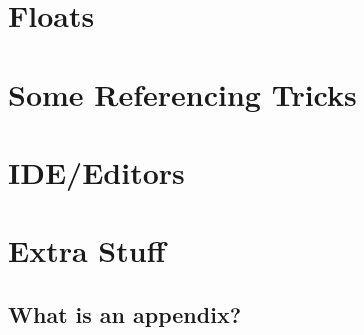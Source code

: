 \documentclass[a4paper,twoside,12pt]{report}
\begin{document}
\chapter{Floats}

\chapter{Some Referencing Tricks}

\chapter{IDE/Editors}

\appendix
\chapter{Extra Stuff}\label{app:extra}
\section{What is an appendix?}\label{app:whatis}

\nocite{*}

\end{document}
